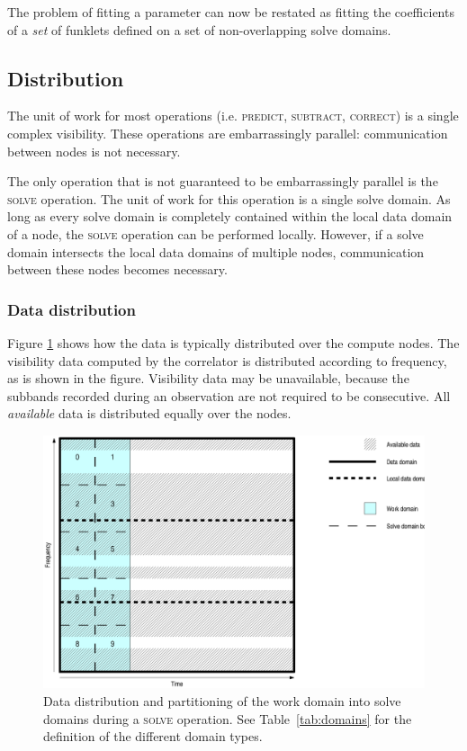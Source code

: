 \documentclass[10pt]{lofar}
\newcommand{\predict}{\textsc{predict}\xspace}
\newcommand{\solve}{\textsc{solve}\xspace}
\newcommand{\subtract}{\textsc{subtract}\xspace}
\newcommand{\correct}{\textsc{correct}\xspace}
\begin{document}
The problem of fitting a parameter can now be restated as fitting the
coefficients of a \emph{set} of funklets defined on a set of non-overlapping
solve domains.

\subsection{Distribution}
\label{subsec:distribution}

The unit of work for most operations (i.e. \predict, \subtract, \correct) is a
single complex visibility. These operations are embarrassingly parallel:
communication between nodes is not necessary.

The only operation that is not guaranteed to be embarrassingly parallel is the
\solve operation. The unit of work for this operation is a single solve domain.
As long as every solve domain is completely contained within the local data
domain of a node, the \solve operation can be performed locally. However, if a
solve domain intersects the local data domains of multiple nodes, communication
between these nodes becomes necessary.

\subsubsection{Data distribution}
\label{subsubsec:distribution-data}
Figure \ref{fig:domains} shows how the data is typically distributed over the
compute nodes. The visibility data computed by the correlator is distributed
according to frequency, as is shown in the figure. Visibility data may be
unavailable, because the subbands recorded during an observation are not
required to be consecutive. All \emph{available} data is distributed equally
over the nodes. 

\begin{figure}[htbp]
\centering
\includegraphics[scale=0.5]{images/solve_domains.ps}
\caption{Data distribution and partitioning of the work domain into solve
domains during a \solve operation. See Table~\ref{tab:domains} for the definition
of the different domain types.}
\label{fig:domains}
\end{figure}
\end{document}

